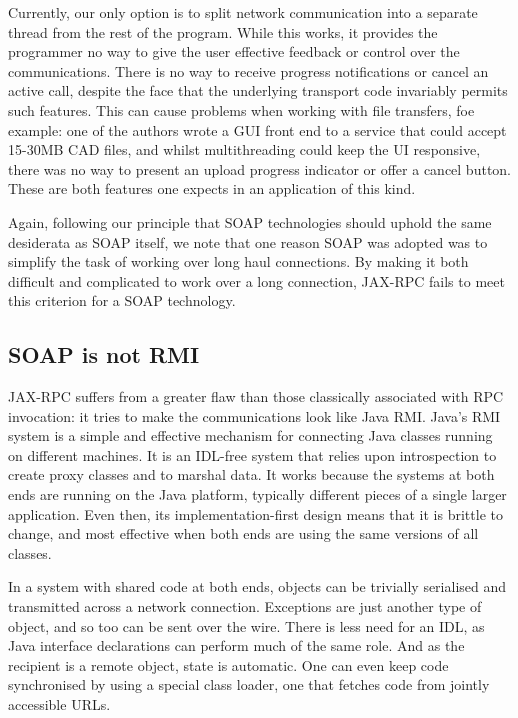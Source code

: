 Currently, our only option is to split network communication into a
separate thread from the rest of the program. While this works, it
provides the programmer no way to give the user effective feedback or
control over the communications. There is no way to receive progress
notifications or cancel an active call, despite the face that the
underlying transport code invariably permits such features. This can
cause problems when working with file transfers, foe example: one of
the authors wrote a GUI front end to a service that could accept
15-30MB CAD files, and whilst multithreading could keep the UI
responsive, there was no way to present an upload progress indicator
or offer a cancel button. These are both features one expects in an
application of this kind.

Again, following our principle that SOAP technologies should uphold
the same desiderata as SOAP itself, we note that one reason SOAP was
adopted was to simplify the task of working over long haul
connections. By making it both difficult and complicated to work over
a long connection, JAX-RPC fails to meet this criterion for a SOAP
technology.

\subsection{SOAP is not RMI}
\label{objections:soap-not-rmi}

JAX-RPC suffers from a greater flaw than those classically associated
with RPC invocation: it tries to make the communications look like
Java RMI. Java's RMI system is a simple and effective mechanism for
connecting Java classes running on different machines. It is an
IDL-free system that relies upon introspection to create proxy classes
and to marshal data. It works because the systems at both ends are
running on the Java platform, typically different pieces of a single
larger application. Even then, its implementation-first design means
that it is brittle to change, and most effective when both ends are
using the same versions of all classes.


In a system with shared code at both ends, objects can be trivially
serialised and transmitted across a network connection. Exceptions are
just another type of object, and so too can be sent over the
wire. There is less need for an IDL, as Java interface declarations
can perform much of the same role. And as the recipient is a remote
object, state is automatic. One can even keep code synchronised by
using a special class loader, one that fetches code from jointly
accessible URLs.

